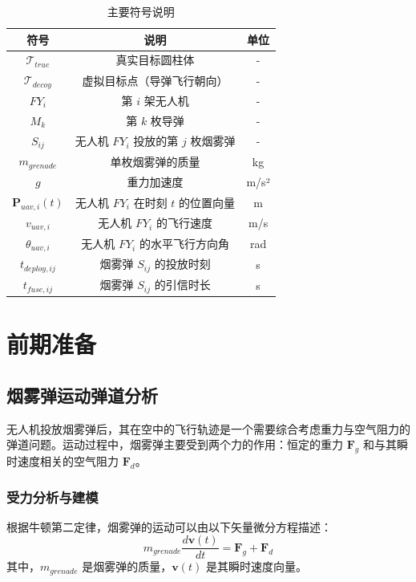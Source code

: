 \documentclass[fontset=SimSun]{ctexart}
\begin{document}
\begin{table}[H]
\centering
\caption{主要符号说明}
\begin{tabularx}{0.9\textwidth}{c C c}
\toprule
\textbf{符号} & \textbf{说明} & \textbf{单位} \\
\midrule
$\mathcal{T}_{true}$ & 真实目标圆柱体 & - \\
$\mathcal{T}_{decoy}$ & 虚拟目标点（导弹飞行朝向） & - \\
$FY_i$ & 第 $i$ 架无人机 & - \\
$M_k$ & 第 $k$ 枚导弹 & - \\
$S_{ij}$ & 无人机 $FY_i$ 投放的第 $j$ 枚烟雾弹 & - \\
$m_{grenade}$ & 单枚烟雾弹的质量 & kg \\
$g$ & 重力加速度 & m/s² \\
$\mathbf{P}_{uav, i}(t)$ & 无人机 $FY_i$ 在时刻 $t$ 的位置向量 & m \\
$v_{uav, i}$ & 无人机 $FY_i$ 的飞行速度 & m/s \\
$\theta_{uav, i}$ & 无人机 $FY_i$ 的水平飞行方向角 & rad \\
$t_{deploy, ij}$ & 烟雾弹 $S_{ij}$ 的投放时刻 & s \\
$t_{fuse, ij}$ & 烟雾弹 $S_{ij}$ 的引信时长 & s \\
\bottomrule
\end{tabularx}
\end{table}
\section{前期准备}

\subsection{烟雾弹运动弹道分析}

无人机投放烟雾弹后，其在空中的飞行轨迹是一个需要综合考虑重力与空气阻力的弹道问题。运动过程中，烟雾弹主要受到两个力的作用：恒定的重力 $ \mathbf{F}_g $ 和与其瞬时速度相关的空气阻力 $ \mathbf{F}_d $。

\subsubsection{受力分析与建模}

根据牛顿第二定律，烟雾弹的运动可以由以下矢量微分方程描述：
\begin{equation}
m_{grenade} \frac{d\mathbf{v}(t)}{dt} = \mathbf{F}_g + \mathbf{F}_d
\label{eq:newton_law}
\end{equation}
其中，$m_{grenade}$ 是烟雾弹的质量，$\mathbf{v}(t)$ 是其瞬时速度向量。
\end{document}
